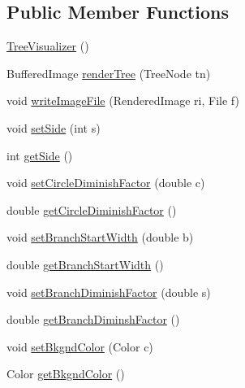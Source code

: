 \subsection*{Public Member Functions}
\begin{DoxyCompactItemize}
\item 
\hyperlink{classorg_1_1jgap_1_1util_1_1tree_1_1_tree_visualizer_af31613fa38ac4d20eba909ba7fdf2100}{Tree\-Visualizer} ()
\item 
Buffered\-Image \hyperlink{classorg_1_1jgap_1_1util_1_1tree_1_1_tree_visualizer_a7dc61be0cbf064b4f168da74d40c1fd3}{render\-Tree} (Tree\-Node tn)
\item 
void \hyperlink{classorg_1_1jgap_1_1util_1_1tree_1_1_tree_visualizer_a22dd0241c15b0fa0d17cac797f723646}{write\-Image\-File} (Rendered\-Image ri, File f)
\item 
void \hyperlink{classorg_1_1jgap_1_1util_1_1tree_1_1_tree_visualizer_ac6b42012f73f5448c8e1c0410ac4c6cd}{set\-Side} (int s)
\item 
int \hyperlink{classorg_1_1jgap_1_1util_1_1tree_1_1_tree_visualizer_a69773cea20ade3ef33f7db87d8d57448}{get\-Side} ()
\item 
void \hyperlink{classorg_1_1jgap_1_1util_1_1tree_1_1_tree_visualizer_a52da9c6e8b9980df499ff42423dad000}{set\-Circle\-Diminish\-Factor} (double c)
\item 
double \hyperlink{classorg_1_1jgap_1_1util_1_1tree_1_1_tree_visualizer_a5bafc6f63cba51f6c228793bc5332c23}{get\-Circle\-Diminish\-Factor} ()
\item 
void \hyperlink{classorg_1_1jgap_1_1util_1_1tree_1_1_tree_visualizer_af7363cb585cb97a07a5c7cf8f0278b37}{set\-Branch\-Start\-Width} (double b)
\item 
double \hyperlink{classorg_1_1jgap_1_1util_1_1tree_1_1_tree_visualizer_aa7cd5915616fabc855aea9cbb8c119cf}{get\-Branch\-Start\-Width} ()
\item 
void \hyperlink{classorg_1_1jgap_1_1util_1_1tree_1_1_tree_visualizer_aa70e298af3ec0623d129a12008071967}{set\-Branch\-Diminish\-Factor} (double s)
\item 
double \hyperlink{classorg_1_1jgap_1_1util_1_1tree_1_1_tree_visualizer_ae9f8decb154a903544fac229e832fe59}{get\-Branch\-Diminsh\-Factor} ()
\item 
void \hyperlink{classorg_1_1jgap_1_1util_1_1tree_1_1_tree_visualizer_ad6cb76501dcbac340cf5fbe1ad24a721}{set\-Bkgnd\-Color} (Color c)
\item 
Color \hyperlink{classorg_1_1jgap_1_1util_1_1tree_1_1_tree_visualizer_a61bf1923b9a72d21f405f563ac636a5f}{get\-Bkgnd\-Color} ()

\end{DoxyCompactItemize}

